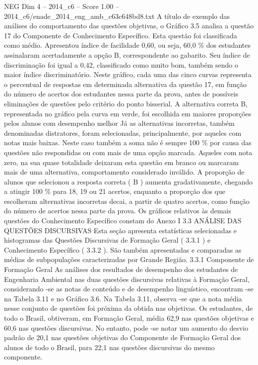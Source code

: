 \begin{textsample}{NEG Dim 4 – 2014\_c6 – Score 1.00 – 2014\_c6/enade\_2014\_eng\_amb\_c63c648bd8.txt}
A título de exemplo das análises do comportamento das questões objetivas, o Gráfico 3.5 analisa a questão 17 do Componente de Conhecimento Específico.
Esta questão foi classificada como médio.
Apresentou índice de facilidade 0,60, ou seja, 60,0 \% dos estudantes assinalaram acertadamente a opção B, correspondente ao gabarito.
Seu índice de discriminação foi igual a 0,42, classificado como muito bom, também sendo o maior índice discriminatório.
Neste gráfico, cada uma das cinco curvas representa o percentual de respostas em determinada alternativa da questão 17, em função do número de acertos dos estudantes nessa parte da prova, antes de possíveis eliminações de questões pelo critério do ponto bisserial.
A alternativa correta B, representada no gráfico pela curva em verde, foi escolhida em maiores proporções pelos alunos com desempenho melhor Já as alternativas incorretas, também denominadas distratores, foram selecionadas, principalmente, por aqueles com notas mais baixas.
Neste caso também a soma não é sempre 100 \% por causa das questões não respondidas ou com mais de uma opção marcada.
Aqueles com nota zero, na sua quase totalidade deixaram esta questão em branco ou marcaram mais de uma alternativa, comportamento considerado inválido.
A proporção de alunos que selecionou a resposta correta ( B ) aumenta gradativamente, chegando a atingir 100 \% para 18, 19 ou 21 acertos, enquanto a proporção dos que escolheram alternativas incorretas decai, a partir de quatro acertos, como função do número de acertos nessa parte da prova.
Os gráficos relativos às demais questões do Conhecimento Específico constam do Anexo I 3.3 ANÁLISE DAS QUESTÕES DISCURSIVAS Esta seção apresenta estatísticas selecionadas e histogramas das Questões Discursivas de Formação Geral ( 3.3.1 ) e Conhecimento Específico ( 3.3.2 ).
São também apresentadas e comparadas as médias de subpopulações caracterizadas por Grande Região. 3.3.1 Componente de Formação Geral As análises dos resultados de desempenho dos estudantes de Engenharia Ambiental nas duas questões discursivas relativas à Formação Geral, considerando -se as notas de conteúdo e de desempenho linguístico, encontram -se na Tabela 3.11 e no Gráfico 3.6.
Na Tabela 3.11, observa -se que a nota média nesse conjunto de questões foi próxima da obtida nas objetivas.
Os estudantes, de todo o Brasil, obtiveram, em Formação Geral, média 62,9 nas questões objetivas e 60,6 nas questões discursivas.
No entanto, pode -se notar um aumento do desvio padrão de 20,1 nas questões objetivas do Componente de Formação Geral dos alunos de todo o Brasil, para 22,1 nas questões discursivas do mesmo componente.

\end{textsample}
